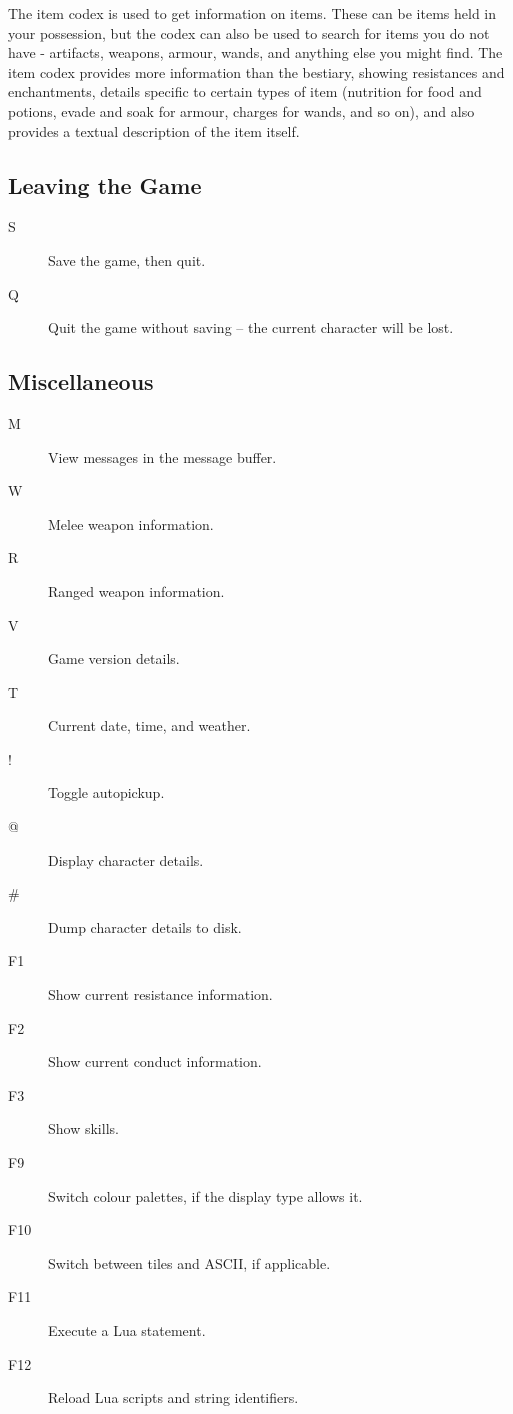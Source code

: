 The item codex is used to get information on items.  These can be items held in your possession, but the codex can also be used to search for items you do not have - artifacts, weapons, armour, wands, and anything else you might find.  The item codex provides more information than the bestiary, showing resistances and enchantments, details specific to certain types of item (nutrition for food and potions, evade and soak for armour, charges for wands, and so on), and also provides a textual description of the item itself.

\subsection{Leaving the Game}

\begin{description}
\item[S] 
Save the game, then quit.
\item[Q] 
Quit the game without saving -- the current character will be lost.
\end{description}

\subsection{Miscellaneous}

\begin{description}
\item[M]
View messages in the message buffer.
\item[W] 
Melee weapon information.
\item[R] 
Ranged weapon information.
\item[V] 
Game version details.
\item[T] 
Current date, time, and weather.
\item[!]
Toggle autopickup.
\item[@]
Display character details.
\item[\#] 
Dump character details to disk.
\item[F1] 
Show current resistance information.
\item[F2] 
Show current conduct information.
\item[F3]
Show skills.
\item[F9]
Switch colour palettes, if the display type allows it.
\item[F10]
Switch between tiles and ASCII, if applicable.
\item[F11] 
Execute a Lua statement.
\item[F12] 
Reload Lua scripts and string identifiers.
\end{description}

